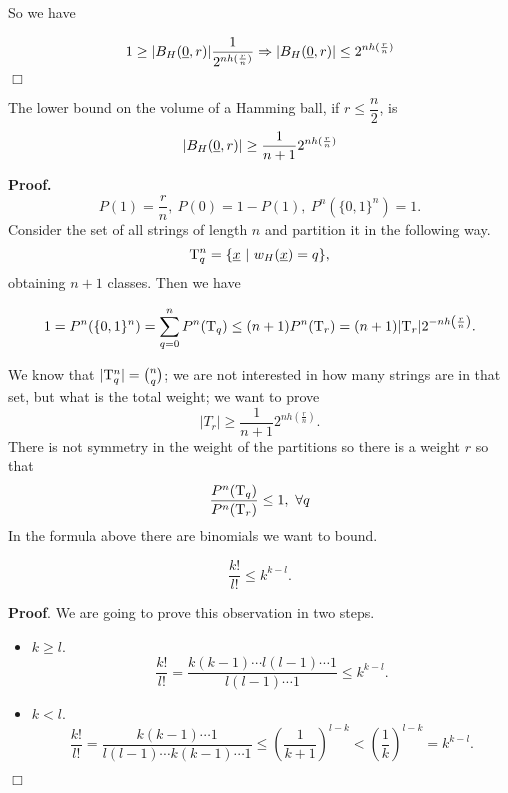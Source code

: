 So we have 

\[1 \geq |B_H(\underline{0}, r)| \dfrac{1}{2^{nh(\frac{r}{n})}} \Rightarrow |B_H(\underline{0}, r)| \leq 2^{nh(\frac{r}{n})}\] 
\hfill$\Box$


\begin{thm}
	The lower bound on the volume of a Hamming ball, if $ r \leq \dfrac{n}{2}$, is
	$$|B_H(\underline{0}, r)| \geq \dfrac{1}{n+1}2^{nh(\frac{r}{n})}$$
\end{thm}

\noindent\textbf{Proof.} $$P(1) = \dfrac{r}{n},\ P(0) = 1 - P(1),\ P^n(\{0, 1\}^n) = 1.$$
Consider the set of all strings of length $n$ and partition it in the following way.
$$\mathrm{T}_q^n = \{\underline{x}\ |\ w_H(\underline{x}) = q\},$$
obtaining $n +1$ classes. Then we have

\[ 1 = P^n(\{0, 1\}^n) = \sum_{q=0}^nP^n(\mathrm{T}_q) \leq (n + 1) P^n(\mathrm{T}_r) = (n+1)|\mathrm{T}_r|2^{-nh\left(\frac{r}{n}\right)}.\]

We know that $|\mathrm{T}_q^n| = \binom{n}{q}$; we are not interested in how many strings are in that set, but what is the total weight; we want to prove $$ |T_r| \geq \dfrac{1}{n+1}2^{nh(\frac{r}{n})}.$$ There is not symmetry in the weight of the partitions so there is a weight $r$ so that
$$ \dfrac{P^n(\mathrm{T}_q)}{P^n(\mathrm{T}_r)} \leq 1,\ \forall q$$
In the formula above there are binomials we want to bound.

\begin{obs}
	$$\dfrac{k!}{l!} \leq k^{k-l}.$$
\end{obs}

\noindent\textbf{Proof}. We are going to prove this observation in two steps.
\begin{itemize}
	\item $k \geq l$. 
		$$\dfrac{k!}{l!} = \dfrac{k(k-1) \cdots l(l -1) \cdots 1}{l(l -1) \cdots 1} \leq k^{k-l}.$$
		
	\item $k < l$.
		$$\dfrac{k!}{l!} = \dfrac{k(k-1) \cdots 1}{l(l -1) \cdots k(k-1) \cdots 1} \leq \left(\dfrac{1}{k+1}\right)^{l-k} < \left(\dfrac{1}{k}\right)^{l-k} = k^{k-l}.$$
\end{itemize}
\hfill$\Box$
